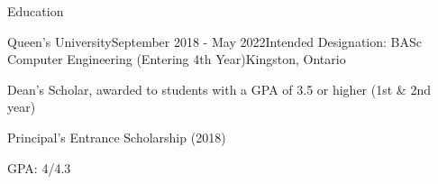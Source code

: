 \documentclass{resume} %
\begin{document}

\begin{rSection}{Education}

\begin{rSubsection}{Queen's University}{September 2018 - May 2022}{Intended
    Designation: BASc Computer Engineering (Entering 4th Year)}{Kingston, Ontario}
\item Dean's Scholar, awarded to students with a GPA of 3.5 or higher (1st \&
  2nd year)
\item Principal's Entrance Scholarship (2018)
\item GPA: 4/4.3
\end{rSubsection}
\end{rSection}

\end{document}
